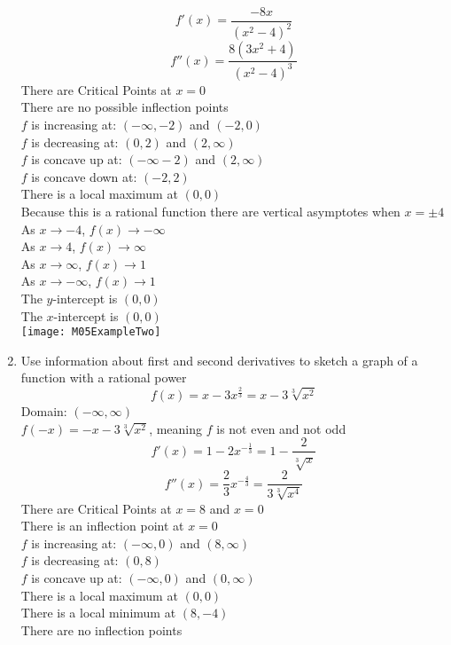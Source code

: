 \documentclass{article}
\begin{document}
\begin{enumerate}
    $$f'(x) = \frac{-8x}{\left(x^2 - 4\right)^2}$$
    $$f''(x) = \frac{8\left(3x^2 + 4\right)}{\left(x^2 - 4\right)^3}$$
    There are Critical Points at $x = 0$ \\
    There are no possible inflection points \\
    $f$ is increasing at: $(-\infty, -2)$ and $(-2, 0)$ \\
    $f$ is decreasing at: $(0, 2)$ and $(2, \infty)$ \\
    $f$ is concave up at: $(-\infty -2)$ and $(2, \infty)$ \\
    $f$ is concave down at: $(-2, 2)$ \\
    There is a local maximum at $\left(0, 0\right)$ \\
    Because this is a rational function there are vertical asymptotes when $x = \pm 4$ \\
    As $x \to -4$, $f(x) \to -\infty$ \\
    As $x \to 4$, $f(x) \to \infty$ \\
    As $x \to \infty$, $f(x) \to 1$ \\
    As $x \to -\infty$, $f(x) \to 1$ \\
    The $y$-intercept is $(0, 0)$ \\
    The $x$-intercept is $(0, 0)$ \\
    \texttt{[image: M05ExampleTwo]}
    \item Use information about first and second derivatives to sketch a graph of a function with a rational power
    $$f(x) = x-3x^{\frac{2}{3}} = x - 3\sqrt[3]{x^2}$$
    Domain: $(-\infty, \infty)$ \\
    $f(-x) = -x - 3\sqrt[3]{x^2}$, meaning $f$ is not even and not odd \\
    $$f'(x) = 1 - 2x^{-\frac{1}{3}} = 1 - \frac{2}{\sqrt[3]{x}}$$
    $$f''(x) = \frac{2}{3}x^{-\frac{4}{3}} = \frac{2}{3\sqrt[3]{x^4}}$$
    There are Critical Points at $x = 8$ and $x = 0$ \\
    There is an inflection point at $x = 0$ \\
    $f$ is increasing at: $(-\infty, 0)$ and $(8, \infty)$ \\
    $f$ is decreasing at: $(0, 8)$ \\
    $f$ is concave up at: $(-\infty, 0)$ and $(0, \infty)$ \\
    There is a local maximum at $(0, 0)$ \\
    There is a local minimum at $(8, -4)$ \\
    There are no inflection points \\

\end{enumerate}
\end{document}
